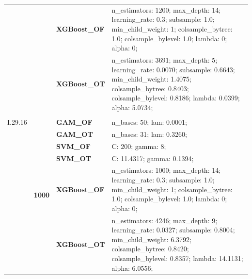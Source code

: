 \documentclass[runningheads]{llncs}
\begin{document}
\begin{table}
\begin{tabularx}{\textwidth}{>{\RaggedRight\arraybackslash}m{1.6cm}p{1.225cm}p{2.05cm}>{\RaggedRight\arraybackslash}X}
        \textbf{}                               & \textbf{}                         & \textbf{XGBoost\_OF} & n\_estimators: 1200; max\_depth: 14; learning\_rate: 0.3; subsample: 1.0; min\_child\_weight: 1; colsample\_bytree: 1.0; colsample\_bylevel: 1.0; lambda: 0; alpha: 0;                            \\
        \textbf{}                               & \textbf{}                         & \textbf{XGBoost\_OT} & n\_estimators: 3691; max\_depth: 5; learning\_rate: 0.0070; subsample: 0.6643; min\_child\_weight: 1.4075; colsample\_bytree: 0.8403; colsample\_bylevel: 0.8186; lambda: 0.0399; alpha: 5.0734;  \\
        \cline{1-4}
        \multirow[t]{14}{=}{\textbf{Feynman                                                                                                                                                                                                                                                                    \\I.29.16}} & \multirow[t]{7}{*}{\textbf{1000}} & \textbf{GAM\_OF} & n\_bases: 50; lam: 0.0001;  \\
        \textbf{}                               & \textbf{}                         & \textbf{GAM\_OT}     & n\_bases: 31; lam: 0.3260;                                                                                                                                                                        \\
        \textbf{}                               & \textbf{}                         & \textbf{SVM\_OF}     & C: 200; gamma: 8;                                                                                                                                                                                 \\
        \textbf{}                               & \textbf{}                         & \textbf{SVM\_OT}     & C: 11.4317; gamma: 0.1394;                                                                                                                                                                        \\
        \textbf{}                               & \textbf{}                         & \textbf{XGBoost\_OF} & n\_estimators: 1000; max\_depth: 14; learning\_rate: 0.3; subsample: 1.0; min\_child\_weight: 1; colsample\_bytree: 1.0; colsample\_bylevel: 1.0; lambda: 0; alpha: 0;                            \\
        \textbf{}                               & \textbf{}                         & \textbf{XGBoost\_OT} & n\_estimators: 4246; max\_depth: 9; learning\_rate: 0.0327; subsample: 0.8004; min\_child\_weight: 6.3792; colsample\_bytree: 0.8420; colsample\_bylevel: 0.8357; lambda: 14.1131; alpha: 6.0556; \\

\end{tabularx}
\end{table}
\end{document}
